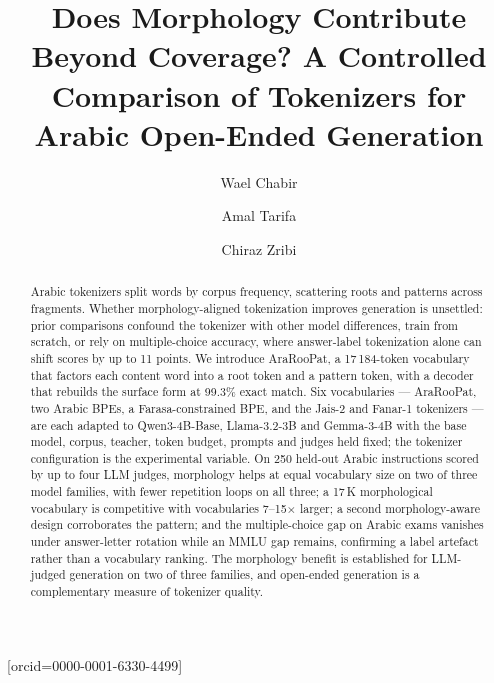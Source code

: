\documentclass[a4paper,fleqn]{cas-sc}
\begin{document}
\let\WriteBookmarks\relax
\def\floatpagepagefraction{1}
\def\textpagefraction{.001}


\title[mode=title]{Does Morphology Contribute Beyond Coverage? A Controlled Comparison of Tokenizers for Arabic Open-Ended Generation}

\author[1]{Wael Chabir}
\cormark[1]

\author[2]{Amal Tarifa}[orcid=0000-0001-6330-4499]

\author[1]{Chiraz Zribi}




\begin{abstract}
Arabic tokenizers split words by corpus frequency, scattering roots and patterns across fragments. Whether morphology-aligned tokenization improves generation is unsettled: prior comparisons confound the tokenizer with other model differences, train from scratch, or rely on multiple-choice accuracy, where answer-label tokenization alone can shift scores by up to 11 points. We introduce AraRooPat, a 17\,184-token vocabulary that factors each content word into a root token and a pattern token, with a decoder that rebuilds the surface form at 99.3\% exact match. Six vocabularies --- AraRooPat, two Arabic BPEs, a Farasa-constrained BPE, and the Jais-2 and Fanar-1 tokenizers --- are each adapted to Qwen3-4B-Base, Llama-3.2-3B and Gemma-3-4B with the base model, corpus, teacher, token budget, prompts and judges held fixed; the tokenizer configuration is the experimental variable. On 250 held-out Arabic instructions scored by up to four LLM judges, morphology helps at equal vocabulary size on two of three model families, with fewer repetition loops on all three; a 17\,K morphological vocabulary is competitive with vocabularies 7--15$\times$ larger; a second morphology-aware design corroborates the pattern; and the multiple-choice gap on Arabic exams vanishes under answer-letter rotation while an MMLU gap remains, confirming a label artefact rather than a vocabulary ranking. The morphology benefit is established for LLM-judged generation on two of three families, and open-ended generation is a complementary measure of tokenizer quality.
\end{abstract}
\end{document}

